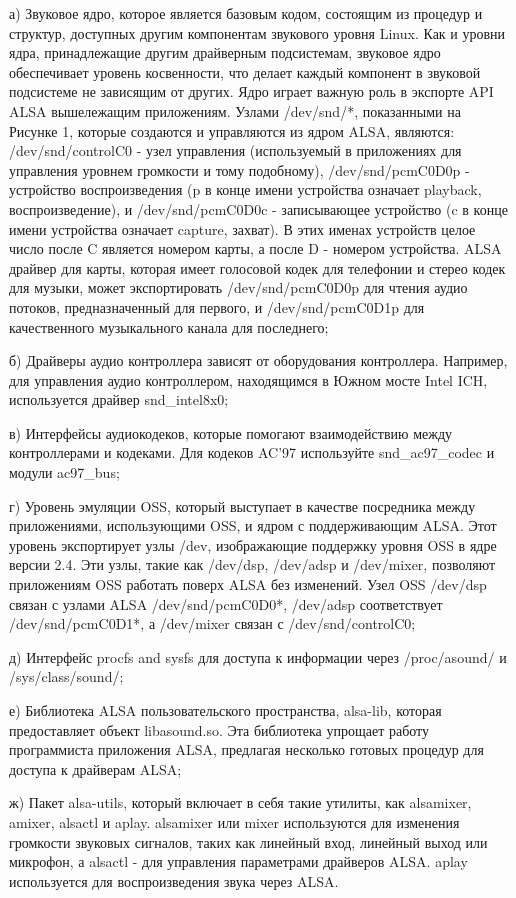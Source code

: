 а) Звуковое ядро, которое является базовым кодом, состоящим из процедур и структур, доступных другим компонентам звукового уровня Linux. Как и уровни ядра, принадлежащие другим драйверным подсистемам, звуковое ядро обеспечивает уровень косвенности, что делает каждый компонент в звуковой подсистеме не зависящим от других. Ядро играет важную роль в экспорте API ALSA вышележащим приложениям. Узлами /dev/snd/*, показанными на Рисунке 1, которые создаются и управляются из ядром ALSA, являются: /dev/snd/controlC0 - узел управления (используемый в приложениях для управления уровнем громкости и тому подобному), /dev/snd/pcmC0D0p - устройство воспроизведения (p в конце имени устройства означает playback, воспроизведение), и /dev/snd/pcmC0D0c - записывающее устройство (c в конце имени устройства означает capture, захват). В этих именах устройств целое число после C является номером карты, а после D - номером устройства. ALSA драйвер для карты, которая имеет голосовой кодек для телефонии и стерео кодек для музыки, может экспортировать /dev/snd/pcmC0D0p для чтения аудио потоков, предназначенный для первого, и /dev/snd/pcmC0D1p для качественного музыкального канала для последнего;

б) Драйверы аудио контроллера зависят от оборудования контроллера. Например, для управления аудио контроллером, находящимся в Южном мосте Intel ICH, используется драйвер snd\_intel8x0; 

в) Интерфейсы аудиокодеков, которые помогают взаимодействию между контроллерами и кодеками. Для кодеков AC’97 используйте snd\_ac97\_codec и модули ac97\_bus;

г) Уровень эмуляции OSS, который выступает в качестве посредника между приложениями, использующими OSS, и ядром с поддерживающим ALSA. Этот уровень экспортирует узлы /dev, изображающие поддержку уровня OSS в ядре версии 2.4. Эти узлы, такие как /dev/dsp, /dev/adsp и /dev/mixer, позволяют приложениям OSS работать поверх ALSA без изменений. Узел OSS /dev/dsp связан с узлами ALSA /dev/snd/pcmC0D0*, /dev/adsp соответствует /dev/snd/pcmC0D1*, а /dev/mixer связан с /dev/snd/controlC0;

д) Интерфейс procfs and sysfs для доступа к информации через /proc/asound/ и /sys/class/sound/;

е) Библиотека ALSA пользовательского пространства, alsa-lib, которая предоставляет объект libasound.so. Эта библиотека упрощает работу программиста приложения ALSA, предлагая несколько готовых процедур для доступа к драйверам ALSA;

ж) Пакет alsa-utils, который включает в себя такие утилиты, как alsamixer, amixer, alsactl и aplay. alsamixer или mixer используются для изменения громкости звуковых сигналов, таких как линейный вход, линейный выход или микрофон, а alsactl - для управления параметрами драйверов ALSA. aplay используется для воспроизведения звука через ALSA.

